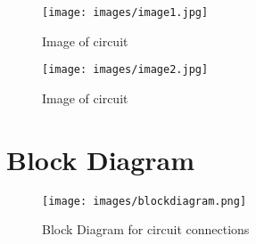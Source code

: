\documentclass{article}
\begin{document}
\begin{figure}[ht]
	\centering
	\texttt{[image: images/image1.jpg]}
	\caption{Image of circuit}
	\label{fig:view}
\end{figure}
\FloatBarrier

\begin{figure}[ht]
	\centering
	\texttt{[image: images/image2.jpg]}
	\caption{Image of circuit}
	\label{fig:view}
\end{figure}
\FloatBarrier

\section*{Block Diagram}
\begin{figure}[ht]
	\centering
	\texttt{[image: images/blockdiagram.png]}
	\caption{Block Diagram for circuit connections}
	\label{fig:view}
\end{figure}
\FloatBarrier
\end{document}
